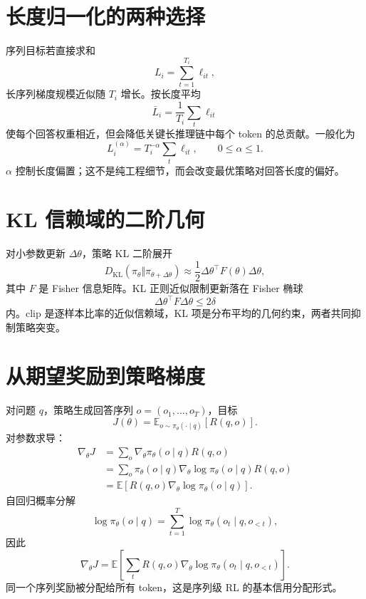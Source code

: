 \documentclass[UTF8,12pt,a4paper,fontset=none]{ctexart}
\numberwithin{equation}{section}
\newcommand{\E}{\mathbb{E}}
\newcommand{\KL}{D_{\mathrm{KL}}}
\begin{document}
\section{长度归一化的两种选择}
序列目标若直接求和
\begin{equation}
 L_i=\sum_{t=1}^{T_i}\ell_{it},
\end{equation}
长序列梯度规模近似随 $T_i$ 增长。按长度平均
\begin{equation}
 \bar L_i=\frac1{T_i}\sum_t\ell_{it}
\end{equation}
使每个回答权重相近，但会降低关键长推理链中每个 token 的总贡献。一般化为
\begin{equation}
 L_i^{(\alpha)}=T_i^{-\alpha}\sum_t\ell_{it},
 \qquad 0\le\alpha\le1.
\end{equation}
$\alpha$ 控制长度偏置；这不是纯工程细节，而会改变最优策略对回答长度的偏好。

\section{KL 信赖域的二阶几何}
对小参数更新 $\Delta\theta$，策略 KL 二阶展开
\begin{equation}
 \KL(\pi_{\theta}\Vert\pi_{\theta+\Delta\theta})
 \approx\frac12\Delta\theta^\top F(\theta)\Delta\theta,
\end{equation}
其中 $F$ 是 Fisher 信息矩阵。KL 正则近似限制更新落在 Fisher 椭球
\begin{equation}
 \Delta\theta^\top F\Delta\theta\le 2\delta
\end{equation}
内。clip 是逐样本比率的近似信赖域，KL 项是分布平均的几何约束，两者共同抑制策略突变。
\clearpage
\section{从期望奖励到策略梯度}
对问题 $q$，策略生成回答序列 $o=(o_1,\ldots,o_T)$，目标
\begin{equation}
 J(\theta)=\E_{o\sim\pi_\theta(\cdot\mid q)}[R(q,o)].
\end{equation}
对参数求导：
\begin{align}
 \nabla_\theta J
 &=\sum_o \nabla_\theta\pi_\theta(o\mid q)R(q,o)\\
 &=\sum_o\pi_\theta(o\mid q)
 \nabla_\theta\log\pi_\theta(o\mid q)R(q,o)\\
 &=\E\left[R(q,o)\nabla_\theta\log\pi_\theta(o\mid q)\right].
\end{align}
自回归概率分解
\begin{equation}
 \log\pi_\theta(o\mid q)=
 \sum_{t=1}^{T}\log\pi_\theta(o_t\mid q,o_{<t}),
\end{equation}
因此
\begin{equation}
 \nabla_\theta J
 =\E\left[
 \sum_t R(q,o)\nabla_\theta\log\pi_\theta(o_t\mid q,o_{<t})
 \right].
\end{equation}
同一个序列奖励被分配给所有 token，这是序列级 RL 的基本信用分配形式。
\end{document}
